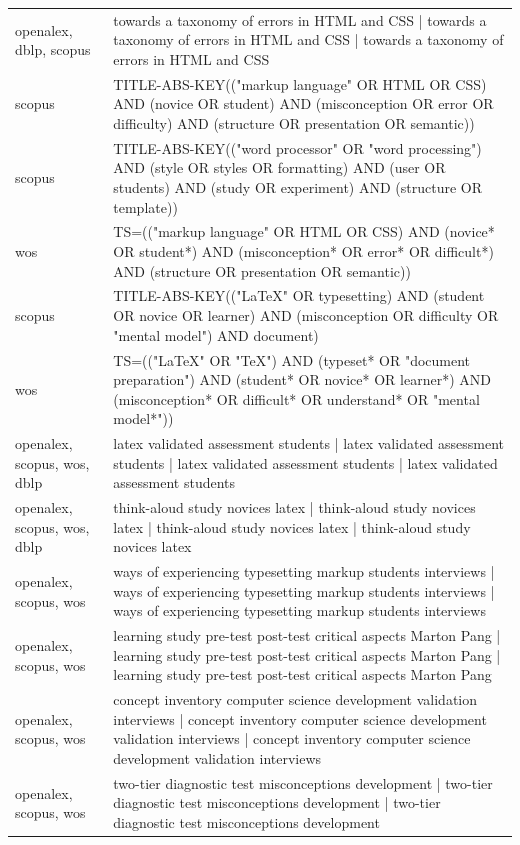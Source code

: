 \documentclass{article}
\begin{document}
\begin{longtable}{lp{10cm}}
openalex, dblp, scopus & towards a taxonomy of errors in HTML and CSS | towards a taxonomy of errors in HTML and CSS | towards a taxonomy of errors in HTML and CSS \\
scopus & TITLE-ABS-KEY(("markup language" OR HTML OR CSS) AND (novice OR student) AND (misconception OR error OR difficulty) AND (structure OR presentation OR semantic)) \\
scopus & TITLE-ABS-KEY(("word processor" OR "word processing") AND (style OR styles OR formatting) AND (user OR students) AND (study OR experiment) AND (structure OR template)) \\
wos & TS=(("markup language" OR HTML OR CSS) AND (novice* OR student*) AND (misconception* OR error* OR difficult*) AND (structure OR presentation OR semantic)) \\
scopus & TITLE-ABS-KEY(("LaTeX" OR typesetting) AND (student OR novice OR learner) AND (misconception OR difficulty OR "mental model") AND document) \\
wos & TS=(("LaTeX" OR "TeX") AND (typeset* OR "document preparation") AND (student* OR novice* OR learner*) AND (misconception* OR difficult* OR understand* OR "mental model*")) \\
openalex, scopus, wos, dblp & latex validated assessment students | latex validated assessment students | latex validated assessment students | latex validated assessment students \\
openalex, scopus, wos, dblp & think-aloud study novices latex | think-aloud study novices latex | think-aloud study novices latex | think-aloud study novices latex \\
openalex, scopus, wos & ways of experiencing typesetting markup students interviews | ways of experiencing typesetting markup students interviews | ways of experiencing typesetting markup students interviews \\
openalex, scopus, wos & learning study pre-test post-test critical aspects Marton Pang | learning study pre-test post-test critical aspects Marton Pang | learning study pre-test post-test critical aspects Marton Pang \\
openalex, scopus, wos & concept inventory computer science development validation interviews | concept inventory computer science development validation interviews | concept inventory computer science development validation interviews \\
openalex, scopus, wos & two-tier diagnostic test misconceptions development | two-tier diagnostic test misconceptions development | two-tier diagnostic test misconceptions development \\

\end{longtable}
\end{document}
